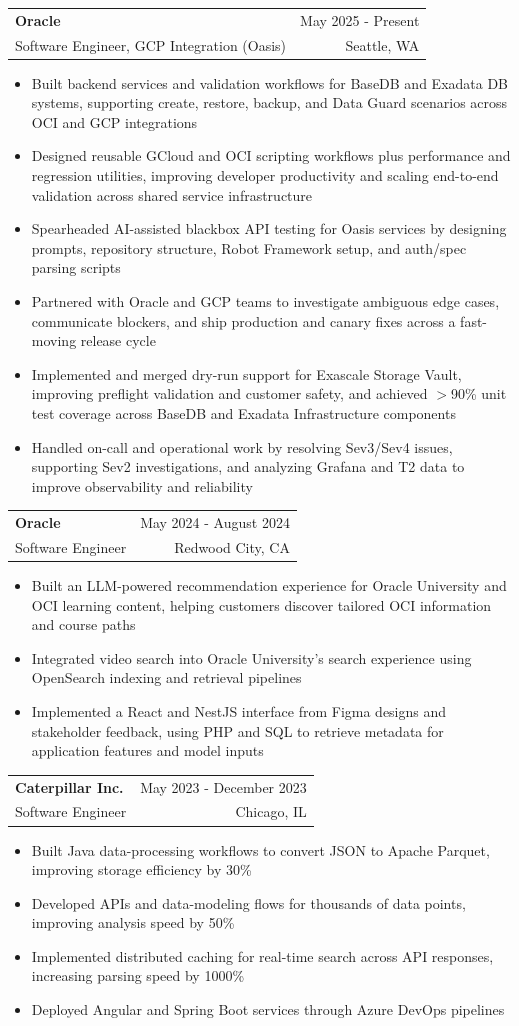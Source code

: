 \documentclass[letterpaper,11pt]{article}
\makeatletter
\newcommand{\resumeItem}[1]{
  \item\small{
    {#1 \vspace{-2pt}}
  }
}
\newcommand{\resumeSubheading}[4]{
  \vspace{-2pt}\item
    \begin{tabular*}{0.97\textwidth}[t]{l@{\extracolsep{\fill}}r}
      \textbf{#1} & #2 \\
      {\small#3} & {\small #4} \\
    \end{tabular*}\vspace{-7pt}
}
\newcommand{\resumeItemListStart}{\begin{itemize}}
\newcommand{\resumeItemListEnd}{\end{itemize}\vspace{-5pt}}
\makeatother
\begin{document}
    \resumeSubheading
  {Oracle}{May 2025 - Present}
  {Software Engineer, GCP Integration (Oasis)}{Seattle, WA}
  \resumeItemListStart
    \resumeItem{Built backend services and validation workflows for BaseDB and Exadata DB systems, supporting create, restore, backup, and Data Guard scenarios across OCI and GCP integrations}
    \resumeItem{Designed reusable GCloud and OCI scripting workflows plus performance and regression utilities, improving developer productivity and scaling end-to-end validation across shared service infrastructure}
    \resumeItem{Spearheaded AI-assisted blackbox API testing for Oasis services by designing prompts, repository structure, Robot Framework setup, and auth/spec parsing scripts}
    \resumeItem{Partnered with Oracle and GCP teams to investigate ambiguous edge cases, communicate blockers, and ship production and canary fixes across a fast-moving release cycle}
    \resumeItem{Implemented and merged dry-run support for Exascale Storage Vault, improving preflight validation and customer safety, and achieved $>$90\% unit test coverage across BaseDB and Exadata Infrastructure components}
    \resumeItem{Handled on-call and operational work by resolving Sev3/Sev4 issues, supporting Sev2 investigations, and analyzing Grafana and T2 data to improve observability and reliability}
  \resumeItemListEnd

    \resumeSubheading
      {Oracle}{May 2024 - August 2024}
      {Software Engineer}{Redwood City, CA}
      \resumeItemListStart
        \resumeItem{Built an LLM-powered recommendation experience for Oracle University and OCI learning content, helping customers discover tailored OCI information and course paths}
        \resumeItem{Integrated video search into Oracle University's search experience using OpenSearch indexing and retrieval pipelines}
        \resumeItem{Implemented a React and NestJS interface from Figma designs and stakeholder feedback, using PHP and SQL to retrieve metadata for application features and model inputs}
      \resumeItemListEnd

    \resumeSubheading
      {Caterpillar Inc.}{May 2023 - December 2023}
      {Software Engineer}{Chicago, IL}
      \resumeItemListStart
        \resumeItem{Built Java data-processing workflows to convert JSON to Apache Parquet, improving storage efficiency by 30\%}
        \resumeItem{Developed APIs and data-modeling flows for thousands of data points, improving analysis speed by 50\%}
        \resumeItem{Implemented distributed caching for real-time search across API responses, increasing parsing speed by 1000\%}
        \resumeItem{Deployed Angular and Spring Boot services through Azure DevOps pipelines}
      \resumeItemListEnd
\end{document}

